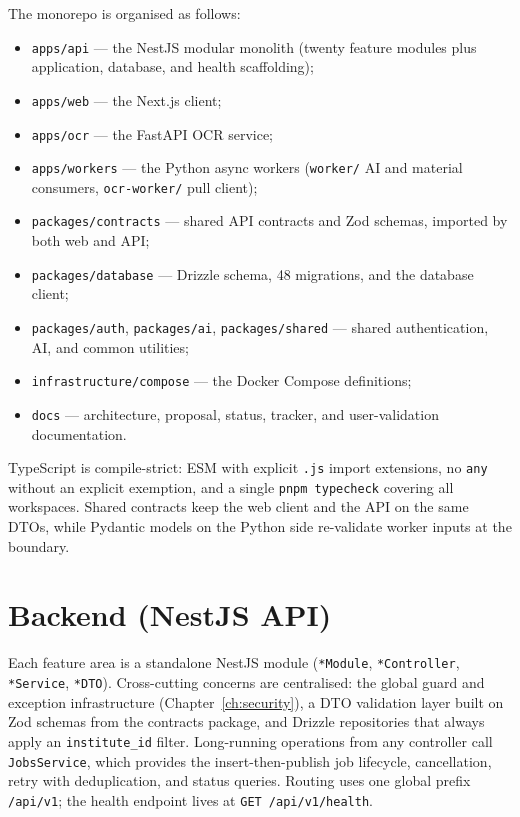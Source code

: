 \noindent The monorepo is organised as follows:

\begin{itemize}
  \item \texttt{apps/api} --- the NestJS modular monolith (twenty feature
  modules plus application, database, and health scaffolding);
  \item \texttt{apps/web} --- the Next.js client;
  \item \texttt{apps/ocr} --- the FastAPI OCR service;
  \item \texttt{apps/workers} --- the Python async workers
  (\texttt{worker/} AI and material consumers, \texttt{ocr-worker/} pull
  client);
  \item \texttt{packages/contracts} --- shared API contracts and Zod schemas,
  imported by both web and API;
  \item \texttt{packages/database} --- Drizzle schema, 48 migrations, and the
  database client;
  \item \texttt{packages/auth}, \texttt{packages/ai}, \texttt{packages/shared}
  --- shared authentication, AI, and common utilities;
  \item \texttt{infrastructure/compose} --- the Docker Compose definitions;
  \item \texttt{docs} --- architecture, proposal, status, tracker, and
  user-validation documentation.
\end{itemize}

\noindent TypeScript is compile-strict: ESM with explicit \texttt{.js} import
extensions, no \texttt{any} without an explicit exemption, and a single
\texttt{pnpm typecheck} covering all workspaces. Shared contracts keep the web
client and the API on the same DTOs, while Pydantic models on the Python side
re-validate worker inputs at the boundary.

\section{Backend (NestJS API)}

\noindent Each feature area is a standalone NestJS module
(\texttt{*Module}, \texttt{*Controller}, \texttt{*Service}, \texttt{*DTO}).
Cross-cutting concerns are centralised: the global guard and exception
infrastructure (Chapter~\ref{ch:security}), a DTO validation layer built on
Zod schemas from the contracts package, and Drizzle repositories that always
apply an \texttt{institute\_id} filter. Long-running operations from any
controller call \texttt{JobsService}, which provides the insert-then-publish
job lifecycle, cancellation, retry with deduplication, and status queries.
Routing uses one global prefix \texttt{/api/v1}; the health endpoint lives at
\texttt{GET /api/v1/health}.


